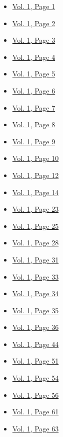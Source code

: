 \begin{itemize}
  \begin{itemize}
  \tightlist
  \item
    \protect\hyperlink{g-page-9}{Vol. 1, Page 1}
  \item
    \protect\hyperlink{g-page-10}{Vol. 1, Page 2}
  \item
    \protect\hyperlink{g-page-11}{Vol. 1, Page 3}
  \item
    \protect\hyperlink{g-page-12}{Vol. 1, Page 4}
  \item
    \protect\hyperlink{g-page-13}{Vol. 1, Page 5}
  \item
    \protect\hyperlink{g-page-14}{Vol. 1, Page 6}
  \item
    \protect\hyperlink{g-page-15}{Vol. 1, Page 7}
  \item
    \protect\hyperlink{g-page-16}{Vol. 1, Page 8}
  \item
    \protect\hyperlink{g-page-17}{Vol. 1, Page 9}
  \item
    \protect\hyperlink{g-page-18}{Vol. 1, Page 10}
  \item
    \protect\hyperlink{g-page-20}{Vol. 1, Page 12}
  \item
    \protect\hyperlink{g-page-22}{Vol. 1, Page 14}
  \item
    \protect\hyperlink{g-page-31}{Vol. 1, Page 23}
  \item
    \protect\hyperlink{g-page-33}{Vol. 1, Page 25}
  \item
    \protect\hyperlink{g-page-36}{Vol. 1, Page 28}
  \item
    \protect\hyperlink{g-page-39}{Vol. 1, Page 31}
  \item
    \protect\hyperlink{g-page-41}{Vol. 1, Page 33}
  \item
    \protect\hyperlink{g-page-42}{Vol. 1, Page 34}
  \item
    \protect\hyperlink{g-page-43}{Vol. 1, Page 35}
  \item
    \protect\hyperlink{g-page-44}{Vol. 1, Page 36}
  \item
    \protect\hyperlink{g-page-52}{Vol. 1, Page 44}
  \item
    \protect\hyperlink{g-page-59}{Vol. 1, Page 51}
  \item
    \protect\hyperlink{g-page-62}{Vol. 1, Page 54}
  \item
    \protect\hyperlink{g-page-64}{Vol. 1, Page 56}
  \item
    \protect\hyperlink{g-page-69}{Vol. 1, Page 61}
  \item
    \protect\hyperlink{g-page-71}{Vol. 1, Page 63}

\end{itemize}
\end{itemize}
